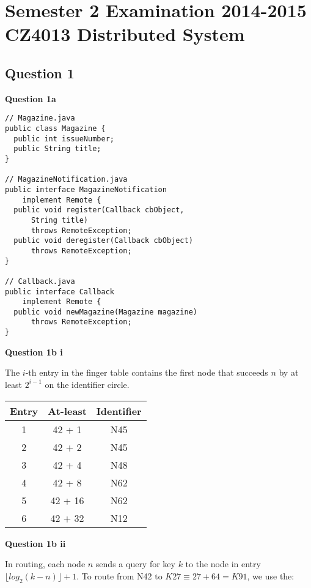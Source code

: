 \documentclass[11pt,a4paper]{report}
\begin{document}
\chapter{Semester 2 Examination 2014-2015\\CZ4013 Distributed System}

\begin{multicols*}{2}

\section{Question 1}

\noindent \textbf{Question 1a}
\begin{verbatim}
// Magazine.java
public class Magazine {
  public int issueNumber;
  public String title;
}

// MagazineNotification.java
public interface MagazineNotification 
    implement Remote {
  public void register(Callback cbObject, 
      String title) 
      throws RemoteException;
  public void deregister(Callback cbObject) 
      throws RemoteException;
}

// Callback.java
public interface Callback 
    implement Remote {
  public void newMagazine(Magazine magazine) 
      throws RemoteException;
}
\end{verbatim}

\noindent \textbf{Question 1b i}

\noindent The $i$-th entry in the finger table contains the first node that succeeds $n$ by at least $2^{i-1}$ on the identifier circle.

\begin{center}
\begin{tabular}{|c|c|c|}
  \hline
  Entry & At-least & Identifier \\ \hline
  1     & 42 + 1   & N45        \\
  2     & 42 + 2   & N45        \\
  3     & 42 + 4   & N48        \\
  4     & 42 + 8   & N62        \\
  5     & 42 + 16  & N62        \\
  6     & 42 + 32  & N12        \\ \hline
\end{tabular}
\end{center}

\noindent \textbf{Question 1b ii}

\noindent In routing, each node $n$ sends a query for key $k$ to the node in entry $\lfloor log_2(k-n) \rfloor + 1$. To route from N42 to $K27 \equiv 27 + 64 = K91$, we use the:


\end{multicols*}
\end{document}
